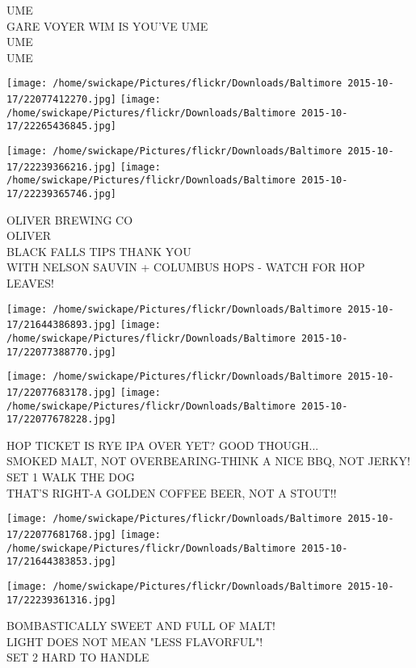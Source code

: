 \documentclass[10pt,letterpaper]{article}
\begin{document}
UME\\
GARE VOYER WIM IS YOU'VE UME\\
UME\\
UME\\
\pagebreak

\texttt{[image: /home/swickape/Pictures/flickr/Downloads/Baltimore 2015-10-17/22077412270.jpg]}
\texttt{[image: /home/swickape/Pictures/flickr/Downloads/Baltimore 2015-10-17/22265436845.jpg]}

\texttt{[image: /home/swickape/Pictures/flickr/Downloads/Baltimore 2015-10-17/22239366216.jpg]}
\texttt{[image: /home/swickape/Pictures/flickr/Downloads/Baltimore 2015-10-17/22239365746.jpg]}

OLIVER BREWING CO\\
OLIVER\\
BLACK FALLS TIPS THANK YOU\\
WITH NELSON SAUVIN + COLUMBUS HOPS {-} WATCH FOR HOP LEAVES!\\
\pagebreak

\texttt{[image: /home/swickape/Pictures/flickr/Downloads/Baltimore 2015-10-17/21644386893.jpg]}
\texttt{[image: /home/swickape/Pictures/flickr/Downloads/Baltimore 2015-10-17/22077388770.jpg]}

\texttt{[image: /home/swickape/Pictures/flickr/Downloads/Baltimore 2015-10-17/22077683178.jpg]}
\texttt{[image: /home/swickape/Pictures/flickr/Downloads/Baltimore 2015-10-17/22077678228.jpg]}

HOP TICKET IS RYE IPA OVER YET?  GOOD THOUGH...\\
SMOKED MALT, NOT OVERBEARING{-}THINK A NICE BBQ, NOT JERKY!\\
SET 1 WALK THE DOG\\
THAT'S RIGHT{-}A GOLDEN COFFEE BEER, NOT A STOUT!!\\
\pagebreak

\texttt{[image: /home/swickape/Pictures/flickr/Downloads/Baltimore 2015-10-17/22077681768.jpg]}
\texttt{[image: /home/swickape/Pictures/flickr/Downloads/Baltimore 2015-10-17/21644383853.jpg]}

\vspace{0.25in}
\texttt{[image: /home/swickape/Pictures/flickr/Downloads/Baltimore 2015-10-17/22239361316.jpg]}

BOMBASTICALLY SWEET AND FULL OF MALT!\\
LIGHT DOES NOT MEAN "LESS FLAVORFUL"!\\
SET 2 HARD TO HANDLE\\
\pagebreak
\end{document}
